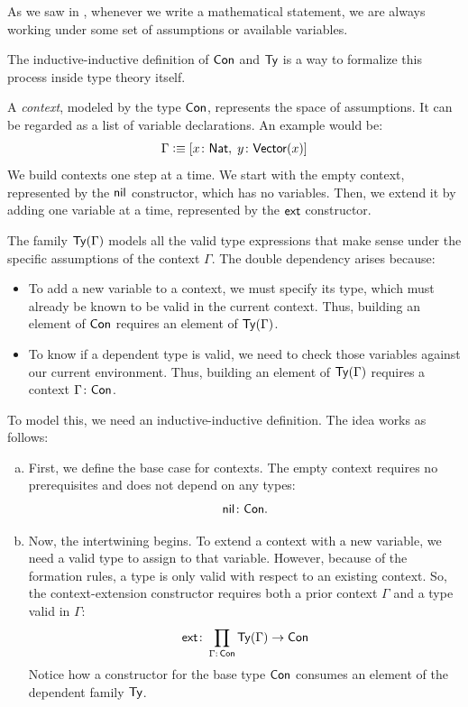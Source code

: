 \begin{xmpl} {}
    As we saw in , whenever we write a mathematical statement, we are always working under some set of assumptions or available variables.
    
    The inductive-inductive definition of $\mathsf{Con}$ and $\mathsf{Ty}$ is a way to formalize this process inside type theory itself.
    
    A \textsl{context}, modeled by the type $\mathsf{Con}$, represents the space of assumptions. It can be regarded as a list of variable declarations. An example would be:
    \[
        \Gamma\defeq
            [
                x\colon\fun{Nat},\;
                y\colon\fun{Vector}(x)
            ]
    \]
    We build contexts one step at a time. We start with the empty context, represented by the $\mathsf{nil}$ constructor, which has no variables. Then, we extend it by adding one variable at a time, represented by the $\mathsf{ext}$ constructor.

    The family $\mathsf{Ty}(\Gamma)$ models all the valid type expressions that make sense under the specific assumptions of the context $\Gamma$. The double dependency arises because:
    \begin{itemize}
        \item To add a new variable to a context, we must specify its type, which must already be known to be valid in the current context. Thus, building an element of $\mathsf{Con}$ requires an element of $\mathsf{Ty}(\Gamma)$.
            
        \item To know if a dependent type is valid, we need to check those variables against our current environment. Thus, building an element of $\mathsf{Ty}(\Gamma)$ requires a context $\Gamma\colon\fun{Con}$.
    \end{itemize}
    
    To model this, we need an inductive-inductive definition. The idea works as follows:
    \begin{enumerate}[a),font=\upshape]
        \item First, we define the base case for contexts. The empty context requires no prerequisites and does not depend on any types:
        \[
            \fun{nil}\colon\fun{Con}.
        \]
        
        \item Now, the intertwining begins. To extend a context with a new variable, we need a valid type to assign to that variable. However, because of the formation rules, a type is only valid with respect to an existing context. So, the context-extension constructor requires both a prior context $\Gamma$ and a type valid in $\Gamma$:
        \[
            \fun{ext}\colon
                \prod_{\Gamma\colon\fun{Con}}
                    \fun{Ty}(\Gamma)\to\fun{Con}
        \]
        Notice how a constructor for the base type $\mathsf{Con}$ consumes an element of the dependent family $\mathsf{Ty}$.
    \end{enumerate}
    

\end{xmpl}
